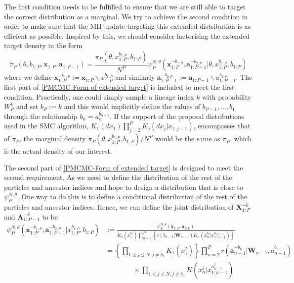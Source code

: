 \documentclass[12pt,a4paper]{article}
\begin{document}
The first condition needs to be fulfilled to ensure that we are still able to target the correct distribution as a marginal. We try to achieve the second condition in order to make sure that the MH update targeting this extended distribution is as efficient as possible. Inspired by this, we should consider factorising the extended target density in the form
\begin{equation}
    \label{PMCMC-Form of extended target}
    \tilde{\pi}_P(\theta,b_{1:P},\mathbf{x}_{1:P},\mathbf{a}_{1:P-1}) = \frac{\pi_{P}(\theta,x_{1:P}^{b_{1:P}},b_{1:P})}{N^P}\psi_P^{N,\theta}(\mathbf{x}_{1:P}^{-b_{1:P}},\mathbf{a}_{1:P-1}^{-b_{2:P}}|\theta,x_{1:P}^{b_{1:P}},b_{1:P})
\end{equation}  
where we define $\mathbf{x}_{1:P}^{-b_{1:P}} := \mathbf{x}_{1:P}\backslash x_{1:P}^{b_{1:P}}$ and similarly $\mathbf{a}_{1:P-1}^{-b_{2:P}} := \mathbf{a}_{1:P-1} \backslash a_{1:P-1}^{b_{2:P}}$. The first part of \eqref{PMCMC-Form of extended target} is included to meet the first condition. Practically, one could simply sample a lineage index $k$ with probability $W_P^k$ and set $b_P:=k$ and this would implicitly define the values of $b_{P-1},...,b_1$ through the relationship $b_n = a_n^{b_{n+1}}$. If the support of the proposal distributions used in the SMC algorithm, $K_1(dx_1)\prod_{j=2}^{P}K_j(dx_j|x_{1:j-1})$, encompasses that of $\pi_P$, the marginal density $\pi_P(\theta,x_{1:P}^{b_{1:P}},b_{1:P})/N^P$ would be the same as $\pi_P$, which is the actual density of our interest. 

The second part of \eqref{PMCMC-Form of extended target} is designed to meet the second requirement. As we need to define the distribution of the rest of the particles and ancestor indices and hope to design a distribution that is close to $\psi_P^{N,\theta}$. One way to do this is to define a conditional distribution of the rest of the particles and ancestor indices. Hence, we can define the joint distribution of $\textbf{X}_{1:P}^{-k}$ and $\textbf{A}_{1:P-1}^{-k}$ to be
\begin{equation}
    \label{Conditional SMC} 
    \begin{split}
        \psi_P^{N,\theta}\left(\mathbf{x}_{1:P}^{-b_{1:P}},\mathbf{a}_{1:P-1}^{-b_{2:P}}|x_{1:P}^{b_{1:P}},b_{1:P}\right) &:= \frac{\psi_P^{N,\theta}(\mathbf{x}_{1:P},\mathbf{a}_{1:P})}{K_1\left(x_1^{b_1}\right)\prod_{n=2}^P \left\{r\left(b_{n-1}|\mathbf{W}_{n-1}\right)K_n\left(x_n^{b_n}|x_{1:n-1}^{b_{1:n-1}}\right)\right\}}\\
        &= \left\{\prod_{1\leq j \leq N,j \neq b_1} K_1\left(x_1^j\right)\right\}\prod_{n=2}^P r\left(\mathbf{a}_{n-1}^{-b_{n}}|\mathbf{W}_{n-1},a_{n-1}^{b_n}\right) \\
        &\quad\quad\quad\quad \times \prod_{1 \leq j \leq N, j \neq b_n} K\left(x_n^j|x_{1:n-1}^{a_{n-1}^j}\right)
    \end{split}
\end{equation} 
\end{document}
